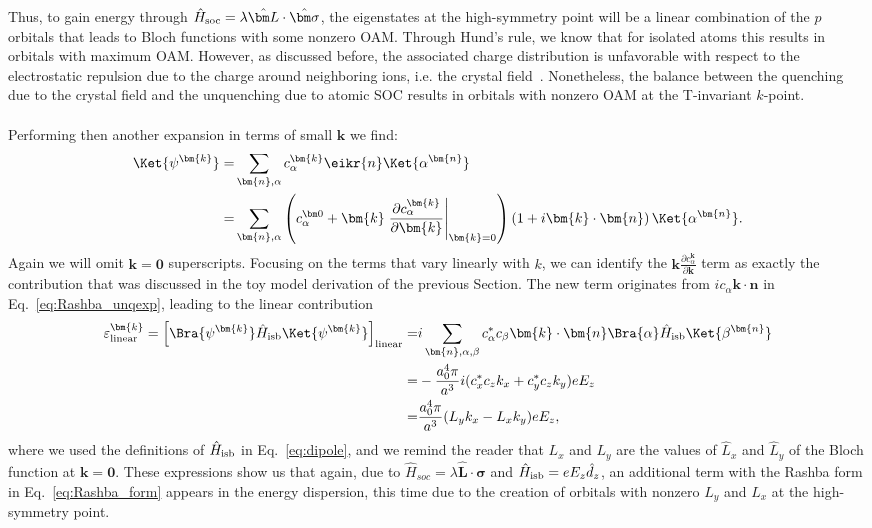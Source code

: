 Thus, to gain energy through $\hat H_{\rm soc} = \lambda \hat {\bm L}\cdot \hat{\bm \sigma}$, the eigenstates at the high-symmetry point will be a linear combination of the $p$ orbitals that leads to Bloch functions with some nonzero OAM.
Through Hund's rule, we know that for isolated atoms this results in orbitals with maximum OAM.
However, as discussed before, the associated charge distribution is unfavorable with respect to the electrostatic repulsion due to the charge around neighboring ions, i.e. the crystal field~\cite{Ballhausen}.
Nonetheless, the balance between the quenching due to the crystal field and the unquenching due to atomic SOC results in orbitals with nonzero OAM at the T-invariant $k$-point. 
\\\\
Performing then another expansion in terms of small $\bm k$ we find:
\begin{align}
	\Ket{\psi^{\bm{k}}} =& \sum_{\bm{n},\alpha} c_\alpha^{\bm{k}} \eikr{n} \Ket{\alpha^{\bm{n}}}\\
	=& \sum_{\bm{n},\alpha} \left(c_\alpha^{\bm 0} + \bm{k}\left.\frac{\partial c_\alpha^{\bm{k}}}{\partial \bm{k}}\right\rvert_{\bm{k}=0} \right)\left(1 + i\bm{k}\cdot\bm{n}\right)\Ket{\alpha^{\bm{n}}}\label{eq:Rashba_unqexp}.
\end{align}
Again we will omit $\bm{k}=\bm 0$ superscripts.
Focusing on the terms that vary linearly with $k$, we can identify the $\bm k \frac{\partial c_\alpha^{\bm k}}{\partial \bm k}$ term as exactly the contribution that was discussed in the toy model derivation of the previous Section.
The new term originates from $ic_\alpha \bm k \cdot \bm n$ in Eq.~\eqref{eq:Rashba_unqexp}, leading to the linear contribution
\begin{align}
	\label{eq:d_z_from_OAM}
	\varepsilon^{\bm{k}}_{\rm linear} = \left[\Bra{\psi^{\bm{k}}} \hat{H}_{\rm isb} \Ket{\psi^{\bm{k}}}\right]_{\rm linear} =&  i\sum_{\bm{n},\alpha,\beta} c_\alpha^* c_\beta \bm{k}\cdot\bm{n}\Bra{\alpha} \hat{H}_{\rm isb} \Ket{\beta^{\bm{n}}}\\
	=&-\frac{a_0^4 \pi}{a^3}i(c^*_xc_zk_x + c^*_yc_z k_y) e E_z  \\
	=&\frac{a_0^4 \pi}{a^3}(L_y k_x - L_x k_y) e E_z,
\end{align}
where we used the definitions of $\hat{H}_{\rm isb}$ in Eq.~\eqref{eq:dipole}, and we remind the reader that $L_x$ and $L_y$ are the values of $\hat{L}_x$ and $\hat{L}_y$ of the Bloch function at $\bm k = \bm 0$.
These expressions show us that again, due to ${\hat{H}_{soc} = \lambda \hat{\bm{L}}\cdot\hat{\bm{\sigma}}}$ and $\hat{H}_{\rm isb} = e E_z \hat{d}_z$, an additional term with the Rashba form in Eq.~\eqref{eq:Rashba_form} appears in the energy dispersion, this time due to the creation of orbitals with nonzero $L_y$ and $L_x$ at the high-symmetry point.
